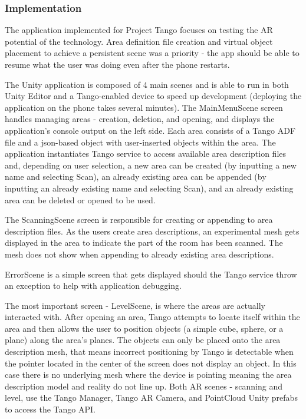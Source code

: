 \documentclass[12pt, a4paper]{article}
\begin{document}
\subsubsection{Implementation}
The application implemented for Project Tango focuses on testing the AR potential of the technology. Area definition file creation and virtual object placement to achieve a persistent scene was a priority - the app should be able to resume what the user was doing even after the phone restarts.

The Unity application is composed of 4 main scenes and is able to run in both Unity Editor and a Tango-enabled device to speed up development (deploying the application on the phone takes several minutes). The MainMenuScene screen handles managing areas - creation, deletion, and opening, and displays the application’s console output on the left side. Each area consists of a Tango ADF file and a json-based object with user-inserted objects within the area. The application instantiates Tango service to access available area description files and, depending on user selection, a new area can be created (by inputting a new name and selecting Scan), an already existing area can be appended (by inputting an already existing name and selecting Scan), and an already existing area can be deleted or opened to be used.

The ScanningScene screen is responsible for creating or appending to area description files. As the users create area descriptions, an experimental mesh gets displayed in the area to indicate the part of the room has been scanned. The mesh does not show when appending to already existing area descriptions.

ErrorScene is a simple screen that gets displayed should the Tango service throw an exception to help with application debugging.

The most important screen - LevelScene, is where the areas are actually interacted with. After opening an area, Tango attempts to locate itself within the area and then allows the user to position objects (a simple cube, sphere, or a plane) along the area’s planes. The objects can only be placed onto the area description mesh, that means incorrect positioning by Tango is detectable when the pointer located in the center of the screen does not display an object. In this case there is no underlying mesh where the device is pointing meaning the area description model and reality do not line up. Both AR scenes - scanning and level, use the Tango Manager, Tango AR Camera, and PointCloud Unity prefabs to access the Tango API.
\end{document}
